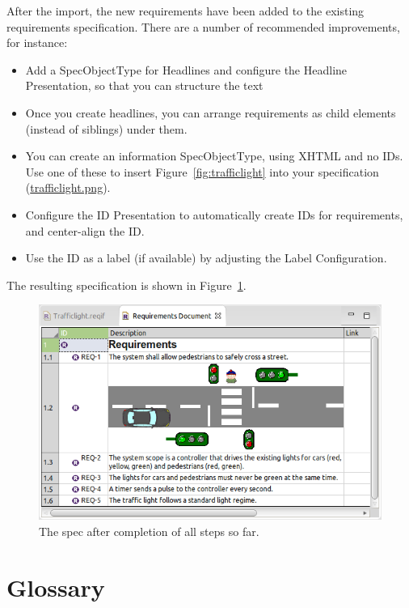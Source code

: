 After the import, the new requirements have been added to the existing requirements specification.  There are a number of recommended improvements, for instance:

\begin{itemize}
\item Add a SpecObjectType for Headlines and configure the Headline Presentation, so that you can structure the text
\item Once you create headlines, you can arrange requirements as child elements (instead of siblings) under them.
\item You can create an information SpecObjectType, using XHTML and no IDs.  Use one of these to insert Figure~\ref{fig:trafficlight} into your specification (\href{../se-materials/tutorial/trafficlight.png}{trafficlight.png}).
\item Configure the ID Presentation to automatically create IDs for requirements, and center-align the ID.
\item Use the ID as a label (if available) by adjusting the Label Configuration.
\end{itemize}

The resulting specification is shown in Figure~\ref{fig:tutorial-step01}.

\begin{figure}[h!]
  \centering
  \includegraphics[width=\linewidth]{../se-images/tutorial-step01.png}
  \caption{The spec after completion of all steps so far.}
  \label{fig:tutorial-step01}
\end{figure}

\section{Glossary}
\label{sec:tutorial-glossary}

